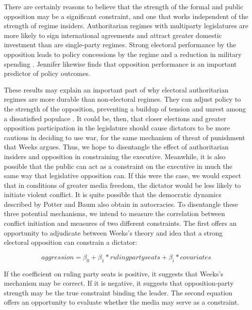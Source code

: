 \documentclass[12pt]{article}
\begin{document}
\par There are certainly reasons to believe that the strength of the formal and public opposition may be a significant constraint, and one that works independent of the strength of regime insiders. Authoritarian regimes with multiparty legislatures are more likely to sign international agreements \autocite{vreeland:2008} and attract greater domestic investment \autocite{gehlbach:2012} than are single-party regimes. Strong electoral performance by the opposition leads to policy concessions by the regime and a reduction in military spending \autocite{miller:2015}. Jennifer \textcite{gandhi:2008} likewise finds that opposition performance is an important predictor of policy outcomes.

\par These results may explain an important part of why electoral authoritarian regimes are more durable than non-electoral regimes. They can adjust policy to the strength of the opposition, preventing a buildup of tension and unrest among a dissatisfied populace \autocites(see )(){he:2011}{he:2013}{truex:2014}. It could be, then, that closer elections and greater opposition participation in the legislature should cause dictators to be more cautious in deciding to use war, for the same mechanism of threat of punishment that Weeks argues. Thus, we hope to disentangle the effect of authoritarian insiders and opposition in constraining the executive. Meanwhile, it is also possible that the public can act as a constraint on the executive in much the same way that legislative opposition can. If this were the case, we would expect that in conditions of greater media freedom, the dictator would be less likely to initiate violent conflict. It is quite possible that the democratic dynamics described by Potter and Baum \autocite*{potter:2014} also obtain in autocracies. To disentangle these three potential mechanisms, we intend to measure the correlation between conflict initiation and measures of two different constraints. The first offers an opportunity to adjudicate between Weeks's theory and idea that a strong electoral opposition can constrain a dictator:

\begin{equation}
aggression = \beta_0 + \beta_1*ruling party seats + \beta_i*covariates
\end{equation}

\par If the coefficient on ruling party seats is positive, it suggests that Weeks's mechanism may be correct. If it is negative, it suggests that opposition-party strength may be the true constraint binding the leader. The second equation offers an opportunity to evaluate whether the media may serve as a constraint. 
\end{document}

